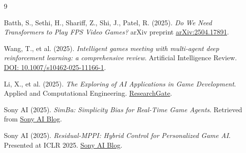 \documentclass[12pt]{article}
\begin{document}
\begin{thebibliography}{9}

Batth, S., Sethi, H., Shariff, Z., Shi, J., Patel, R. (2025). 
\textit{Do We Need Transformers to Play FPS Video Games?} 
arXiv preprint \href{https://arxiv.org/abs/2504.17891}{arXiv:2504.17891}.

Wang, T., et al. (2025). 
\textit{Intelligent games meeting with multi-agent deep reinforcement learning: a comprehensive review}. 
Artificial Intelligence Review. \href{https://link.springer.com/article/10.1007/s10462-025-11166-1}{DOI: 10.1007/s10462-025-11166-1}.

Li, X., et al. (2025). 
\textit{The Exploring of AI Applications in Game Development}. 
Applied and Computational Engineering. 
\href{https://www.researchgate.net/publication/391984191}{ResearchGate}.

Sony AI (2025). 
\textit{SimBa: Simplicity Bias for Real-Time Game Agents}. 
Retrieved from \href{https://ai.sony/blog/Sony-AI-at-ICLR-2025-Refining-Diffusion-Models-Reinforcement-Learning-and-AI-Personalization}{Sony AI Blog}.

Sony AI (2025). 
\textit{Residual-MPPI: Hybrid Control for Personalized Game AI}. 
Presented at ICLR 2025. 
\href{https://ai.sony/blog/Sony-AI-at-ICLR-2025-Refining-Diffusion-Models-Reinforcement-Learning-and-AI-Personalization}{Sony AI Blog}.

\end{thebibliography}
\end{document}
